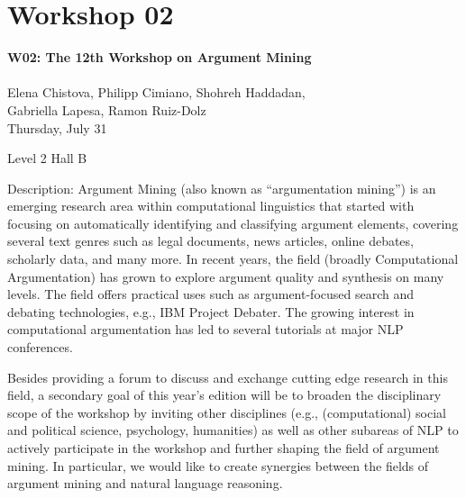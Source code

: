 \clearpage



\section[W02: The 12th Workshop on Argument Mining]{Workshop 02}
\label{workshop_2}

\begin{center}
    {\Large \textbf{W02: The 12th Workshop on Argument Mining}}\\
    \\


    Elena Chistova, Philipp Cimiano, Shohreh Haddadan, \\
    Gabriella Lapesa, Ramon Ruiz-Dolz \\                                                                                                                                                                                            

    Thursday, July 31
    
    Level 2 Hall B

\end{center}
	
Description: Argument Mining (also known as “argumentation mining”) is an emerging research area within computational linguistics that started with focusing on automatically identifying and classifying argument elements, covering several text genres such as legal documents, news articles, online debates, scholarly data, and many more. In recent years, the field (broadly Computational Argumentation) has grown to explore argument quality and synthesis on many levels. The field offers practical uses such as argument-focused search and debating technologies, e.g., IBM Project Debater. The growing interest in computational argumentation has led to several tutorials at major NLP conferences.

Besides providing a forum to discuss and exchange cutting edge research in this field, a secondary goal of this year's edition will be to broaden the disciplinary scope of the workshop by inviting other disciplines (e.g., (computational) social and political science, psychology, humanities) as well as other subareas of NLP to actively participate in the workshop and further shaping the field of argument mining. In particular, we would like to create synergies between the fields of argument mining and natural language reasoning.	
